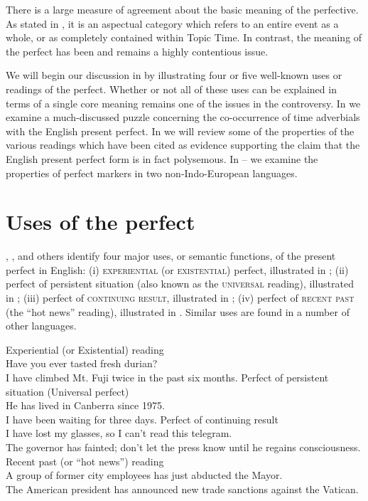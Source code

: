 There is a large measure of agreement about the basic meaning of the perfective. As stated in , it is an aspectual category which refers to an entire event as a whole, or as completely contained within Topic Time. In contrast, the meaning of the perfect has been and remains a highly contentious issue.



We will begin our discussion in  by illustrating four or five well-known uses or readings of the perfect. Whether or not all of these uses can be explained in terms of a single core meaning remains one of the issues in the controversy. In  we examine a much-discussed puzzle concerning the co-occurrence of time adverbials with the English present perfect. In  we will review some of the properties of the various readings which have been cited as evidence supporting the claim that the English present perfect form is in fact polysemous. In -- we examine the properties of perfect markers in two non-Indo-European languages.


\section{Uses of the perfect}\label{sec:22.2}

\citet{McCawley1971}, \citet{Comrie1976}, and others identify four major uses, or semantic functions, of the present perfect in English: (i) \textsc{experiential} (or \textsc{existential}) perfect, illustrated in ; (ii) perfect of persistent situation (also known as the \textsc{universal} reading), illustrated in ; (iii) perfect of \textsc{continuing result}, illustrated in ; (iv) perfect of \textsc{recent past} (the “hot news” reading), illustrated in . Similar uses are found in a number of other languages.


\ea \label{ex:22.3}
Experiential (or Existential) reading\\
\ea Have you ever tasted fresh durian?\\
\ex I have climbed Mt. Fuji twice in the past six months.
   \z
\ex \label{ex:22.4}
Perfect of persistent situation (Universal perfect)\\
\ea He has lived in Canberra since 1975.\\
\ex I have been waiting for three days.
   \z
\ex \label{ex:22.5}
Perfect of continuing result\\
\ea I have lost my glasses, so I can’t read this telegram.\\
\ex The governor has fainted; don’t let the press know until he regains consciousness.
   \z
\ex \label{ex:22.6}
Recent past (or “hot news”) reading\\
\ea A group of former city employees has just abducted the Mayor.\\
\ex The American president has announced new trade sanctions against the Vatican.
   \z
\z


